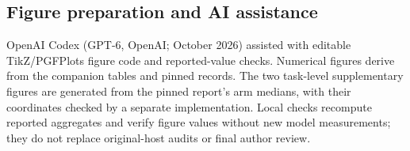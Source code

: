 \subsection{Figure preparation and AI assistance}
OpenAI Codex (GPT-6, OpenAI; October 2026) assisted with editable TikZ/PGFPlots figure code and reported-value checks. Numerical figures derive from the companion tables and pinned records. The two task-level supplementary figures are generated from the pinned report's arm medians, with their coordinates checked by a separate implementation. Local checks recompute reported aggregates and verify figure values without new model measurements; they do not replace original-host audits or final author review.
